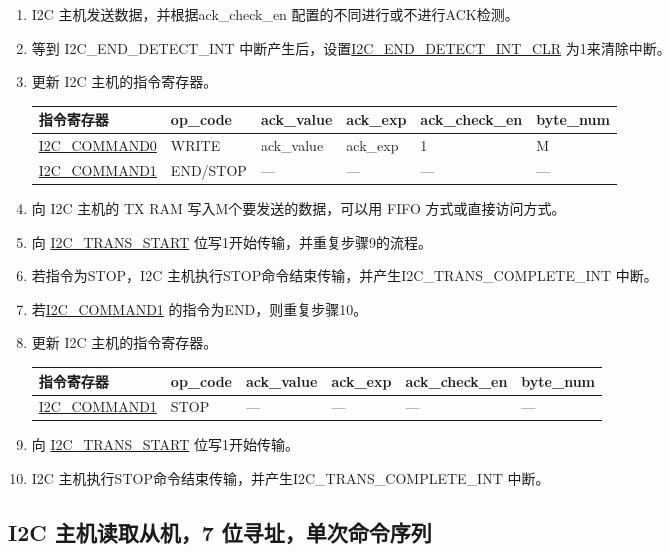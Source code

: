 \documentclass[main\_\_CN.tex]{subfiles}
\begin{document}
\begin{enumerate}
\item I2C 主机发送数据，并根据ack\_check\_en 配置的不同进行或不进行ACK检测。

\item 等到 I2C\_END\_DETECT\_INT 中断产生后，设置\hyperref[fielddesc:I2CENDDETECTINTCLR]{I2C\_END\_DETECT\_INT\_CLR} 为1来清除中断。
\item 更新 I2C 主机的指令寄存器。
\begin{longtable}{ | p{4cm} | p{2cm} | p{2cm} | p{2cm} |p{2cm} | p{2cm} |}
\hline\rowcolor{lightgray}
指令寄存器& op\_code & ack\_value&ack\_exp&ack\_check\_en&byte\_num  \\ \hline
\hyperref[fielddesc:I2CCOMMAND0]{I2C\_COMMAND0} & WRITE& ack\_value&ack\_exp&1&M  \\ \hline
\hyperref[fielddesc:I2CCOMMAND1]{I2C\_COMMAND1} & END/STOP& ---&---&---&---  \\ \hline
\end{longtable}
\item 向 I2C 主机的 TX RAM 写入M个要发送的数据，可以用 FIFO 方式或直接访问方式。
\item 向 \hyperref[fielddesc:I2CTRANSSTART]{I2C\_TRANS\_START} 位写1开始传输，并重复步骤9的流程。
\item 若指令为STOP，I2C 主机执行STOP命令结束传输，并产生I2C\_TRANS\_COMPLETE\_INT 中断。
\item 若\hyperref[fielddesc:I2CCOMMAND1]{I2C\_COMMAND1} 的指令为END，则重复步骤10。
\item 更新 I2C 主机的指令寄存器。
\begin{longtable}{ | p{4cm} | p{2cm} | p{2cm} | p{2cm} |p{2cm} | p{2cm} |}
\hline\rowcolor{lightgray}
指令寄存器& op\_code & ack\_value&ack\_exp&ack\_check\_en&byte\_num  \\ \hline
\hyperref[fielddesc:I2CCOMMAND1]{I2C\_COMMAND1} & STOP& ---&---&---&---  \\ \hline
\end{longtable}
\item 向 \hyperref[fielddesc:I2CTRANSSTART]{I2C\_TRANS\_START} 位写1开始传输。
\item I2C 主机执行STOP命令结束传输，并产生I2C\_TRANS\_COMPLETE\_INT 中断。

\end{enumerate}



\subsection{I2C 主机读取从机，7 位寻址，单次命令序列}
\end{document}
